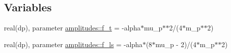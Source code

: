 \subsection*{Variables}
\begin{DoxyCompactItemize}
\item 
real(dp), parameter \hyperlink{namespaceamplitudes_a592f05bd4b5b0efc3ce15d946e8dd373}{amplitudes\+::f\+\_\+t} = -\/alpha$\ast$mu\+\_\+p$\ast$$\ast$2/(4$\ast$m\+\_\+p$\ast$$\ast$2)
\item 
real(dp), parameter \hyperlink{namespaceamplitudes_a66225c0cf7502883252939f6ab9b5b27}{amplitudes\+::f\+\_\+ls} = -\/alpha$\ast$(8$\ast$mu\+\_\+p -\/ 2)/(4$\ast$m\+\_\+p$\ast$$\ast$2)
\end{DoxyCompactItemize}
